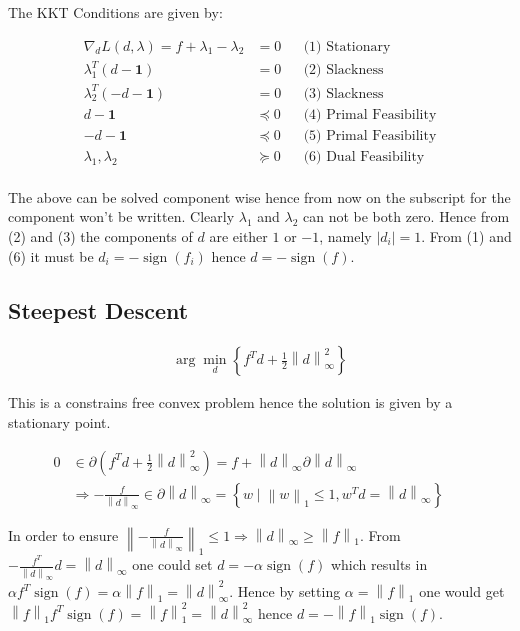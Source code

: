 \documentclass[]{article}
\DeclareMathOperator{\sign}{sign}
\newcommand{\MyParen}[1]{\left( #1 \right)}
\newcommand{\MyBrace}[1]{\left\lbrace #1 \right\rbrace}
\newcommand{\MyNorm}[2]{{\left\| #1 \right\|}_{#2}}
\newcommand{\MyNormSqr}[2]{{\left\| #1 \right\|}_{#2}^{2}}
\newcommand{\MyAbs}[1]{\left| #1 \right|}
\begin{document}
	The KKT Conditions are given by:
	
	\begin{align*}
	{\nabla}_{d} L \MyParen{ d, \lambda } = f + {\lambda}_{1} - {\lambda}_{2} & = 0 && \text{(1) Stationary} \\
	{\lambda}_{1}^{T} \MyParen{ d - \boldsymbol{1} } 	& = 0 		&& \text{(2) Slackness} \\
	{\lambda}_{2}^{T} \MyParen{ -d - \boldsymbol{1} } 	& = 0 		&& \text{(3) Slackness} \\
	d - \boldsymbol{1}						& \preceq 0 	&& \text{(4) Primal Feasibility} \\
	-d - \boldsymbol{1}						& \preceq 0 	&& \text{(5) Primal Feasibility} \\
	{\lambda}_{1}, {\lambda}_{2} 							& \succeq 0 	&& \text{(6) Dual Feasibility} \\
	\end{align*}
	
	The above can be solved component wise hence from now on the subscript for the component won't be written. Clearly $ {\lambda}_{1} $ and $ {\lambda}_{2} $ can not be both zero. Hence from (2) and (3) the components of $ d $ are either $ 1 $ or $ -1 $, namely $ \MyAbs{{d}_{i}} = 1 $. From (1) and (6) it must be $ {d}_{i} = - \sign \MyParen{ {f}_{i} } $ hence $ d = -\sign \MyParen{f} $.
	
	\subsection{Steepest Descent}
	
	\begin{align*}
	\arg \min_{ d } \MyBrace{ {f}^{T} d + \frac{1}{2} \MyNormSqr{d}{\infty} }
	\end{align*}
	
	This is a constrains free convex problem hence the solution is given by a stationary point.
	
	\begin{align*}
	0 & \in \partial \MyParen{{f}^{T} d + \frac{1}{2} \MyNormSqr{d}{\infty}} = f + \MyNorm{d}{\infty} \partial \MyNorm{d}{\infty} && \text{} \\
	& \Rightarrow - \frac{f}{ \MyNorm{d}{\infty} } \in \partial \MyNorm{d}{\infty} = \MyBrace{ w \mid \MyNorm{w}{1} \leq 1, {w}^{T} d = \MyNorm{d}{\infty} }
	\end{align*}
	
	In order to ensure $ \MyNorm{- \frac{f}{ \MyNorm{d}{\infty} }}{1} \leq 1 \Rightarrow \MyNorm{d}{\infty} \geq \MyNorm{f}{1} $. From $ - \frac{ {f}^{T} }{ \MyNorm{d}{\infty} } d = \MyNorm{d}{\infty} $ one could set $ d = -\alpha \sign \MyParen{f} $ which results in $ \alpha {f}^{T} \sign \MyParen{f} = \alpha \MyNorm{f}{1} = \MyNorm{d}{\infty}^{2} $. Hence by setting $ \alpha = \MyNorm{f}{1} $ one would get $ \MyNorm{f}{1} {f}^{T} \sign \MyParen{f} = \MyNorm{f}{1}^{2} = \MyNorm{d}{\infty}^{2} $ hence $ d = - \MyNorm{f}{1} \sign \MyParen{f} $.
	
	
\end{document}
